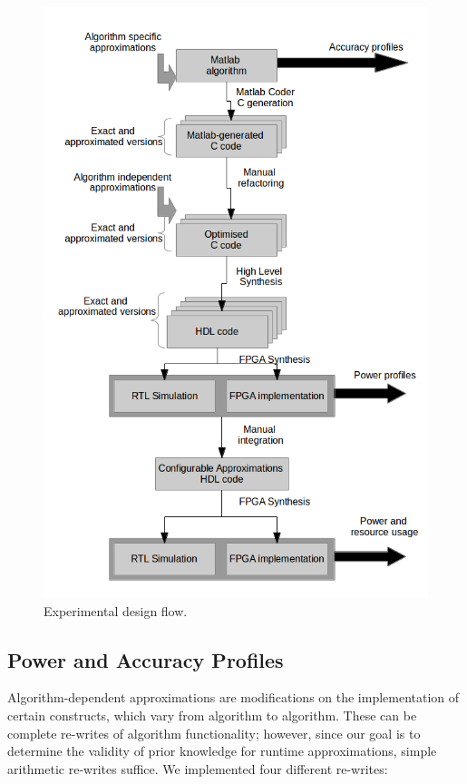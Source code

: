 \begin{figure}[tb]
  \centering
  \includegraphics[width=0.9\columnwidth]{img/experimental_flow.png}
  \caption{Experimental design flow.}
  \label{fig:experimental_flow}
\end{figure}

\subsection{Power and Accuracy Profiles}\label{subsec:profiles}

Algorithm-dependent approximations are modifications on the implementation of certain constructs, which vary from algorithm to algorithm. These can be complete re-writes of algorithm functionality; however, since our goal is to determine the validity of prior knowledge for runtime approximations, simple arithmetic re-writes suffice. We implemented four different re-writes:

